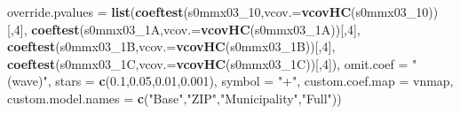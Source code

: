 \documentclass[
]{article}
\newenvironment{Shaded}{\begin{snugshade}}{\end{snugshade}}
\newcommand{\DataTypeTok}[1]{\textcolor[rgb]{0.13,0.29,0.53}{#1}}
\newcommand{\DecValTok}[1]{\textcolor[rgb]{0.00,0.00,0.81}{#1}}
\newcommand{\FloatTok}[1]{\textcolor[rgb]{0.00,0.00,0.81}{#1}}
\newcommand{\KeywordTok}[1]{\textcolor[rgb]{0.13,0.29,0.53}{\textbf{#1}}}
\newcommand{\NormalTok}[1]{#1}
\newcommand{\StringTok}[1]{\textcolor[rgb]{0.31,0.60,0.02}{#1}}
\begin{document}
\begin{Shaded}
\begin{Highlighting}[]
          \DataTypeTok{override.pvalues =} \KeywordTok{list}\NormalTok{(}\KeywordTok{coeftest}\NormalTok{(s0mmx03_}\DecValTok{10}\NormalTok{,}\DataTypeTok{vcov.=}\KeywordTok{vcovHC}\NormalTok{(s0mmx03_}\DecValTok{10}\NormalTok{))[,}\DecValTok{4}\NormalTok{],}
                                  \KeywordTok{coeftest}\NormalTok{(s0mmx03_1A,}\DataTypeTok{vcov.=}\KeywordTok{vcovHC}\NormalTok{(s0mmx03_1A))[,}\DecValTok{4}\NormalTok{],}
                                  \KeywordTok{coeftest}\NormalTok{(s0mmx03_1B,}\DataTypeTok{vcov.=}\KeywordTok{vcovHC}\NormalTok{(s0mmx03_1B))[,}\DecValTok{4}\NormalTok{],}
                                  \KeywordTok{coeftest}\NormalTok{(s0mmx03_1C,}\DataTypeTok{vcov.=}\KeywordTok{vcovHC}\NormalTok{(s0mmx03_1C))[,}\DecValTok{4}\NormalTok{]),}
          \DataTypeTok{omit.coef =} \StringTok{"(wave)"}\NormalTok{, }\DataTypeTok{stars =} \KeywordTok{c}\NormalTok{(}\FloatTok{0.1}\NormalTok{,}\FloatTok{0.05}\NormalTok{,}\FloatTok{0.01}\NormalTok{,}\FloatTok{0.001}\NormalTok{), }\DataTypeTok{symbol =} \StringTok{"+"}\NormalTok{,}
          \DataTypeTok{custom.coef.map =}\NormalTok{ vnmap, }
          \DataTypeTok{custom.model.names =} \KeywordTok{c}\NormalTok{(}\StringTok{"Base"}\NormalTok{,}\StringTok{"ZIP"}\NormalTok{,}\StringTok{"Municipality"}\NormalTok{,}\StringTok{"Full"}\NormalTok{))}
\end{Highlighting}
\end{Shaded}
\end{document}
